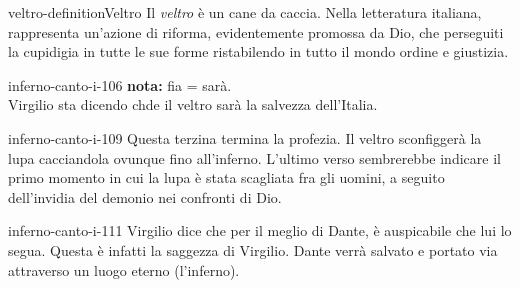 \documentclass[preview]{standalone}
\begin{document}
\begin{snippetdefinition}{veltro-definition}{Veltro}
    Il \textit{veltro} è un cane da caccia.
    Nella letteratura italiana, rappresenta un'azione di riforma,
    evidentemente promossa da Dio, che perseguiti la cupidigia in tutte le sue forme
    ristabilendo in tutto il mondo ordine e giustizia. 
\end{snippetdefinition}

\begin{snippet}{inferno-canto-i-106}
    \textbf{\color{red}nota:} fia = sarà. \\
    Virgilio sta dicendo chde il veltro sarà la salvezza dell'Italia.
\end{snippet}

\begin{snippet}{inferno-canto-i-109}
    Questa terzina termina la profezia.
    Il veltro sconfiggerà la lupa cacciandola ovunque fino all'inferno.
    L'ultimo verso sembrerebbe indicare il primo momento in cui la lupa è stata scagliata
    fra gli uomini, a seguito dell'invidia del demonio nei confronti di Dio.
\end{snippet}

\begin{snippet}{inferno-canto-i-111}
    Virgilio dice che per il meglio di Dante, è auspicabile che lui lo segua.
    Questa è infatti la saggezza di Virgilio.
    Dante verrà salvato e portato via attraverso un luogo eterno (l'inferno).
\end{snippet}
\end{document}
